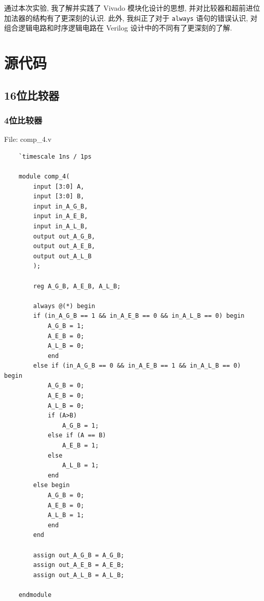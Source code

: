 \documentclass{article}
\begin{document}
通过本次实验, 我了解并实践了 Vivado 模块化设计的思想, 并对比较器和超前进位加法器的结构有了更深刻的认识. 此外, 我纠正了对于 \lstinline|always| 语句的错误认识, 对组合逻辑电路和时序逻辑电路在 Verilog 设计中的不同有了更深刻的了解.


\section{源代码}

\subsection{16位比较器}

\subsubsection{4位比较器}

File: comp\_4.v
\begin{lstlisting}
    `timescale 1ns / 1ps

    module comp_4(
        input [3:0] A,
        input [3:0] B,
        input in_A_G_B,
        input in_A_E_B,
        input in_A_L_B,
        output out_A_G_B,
        output out_A_E_B,
        output out_A_L_B
        );
        
        reg A_G_B, A_E_B, A_L_B;
        
        always @(*) begin
        if (in_A_G_B == 1 && in_A_E_B == 0 && in_A_L_B == 0) begin
            A_G_B = 1;
            A_E_B = 0;
            A_L_B = 0;
            end
        else if (in_A_G_B == 0 && in_A_E_B == 1 && in_A_L_B == 0) begin
            A_G_B = 0;
            A_E_B = 0;
            A_L_B = 0;
            if (A>B)
                A_G_B = 1;
            else if (A == B)
                A_E_B = 1;
            else
                A_L_B = 1;
            end
        else begin
            A_G_B = 0;
            A_E_B = 0;
            A_L_B = 1;
            end
        end
        
        assign out_A_G_B = A_G_B;
        assign out_A_E_B = A_E_B;
        assign out_A_L_B = A_L_B;
          
    endmodule    
\end{lstlisting}
\end{document}
